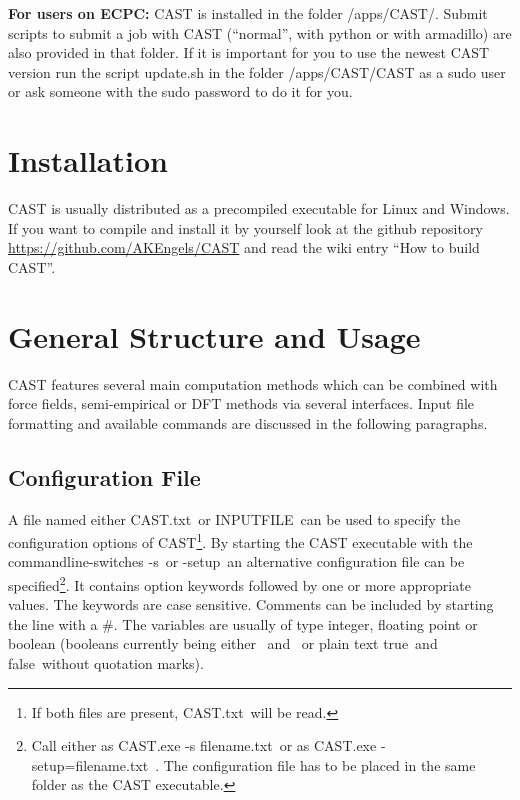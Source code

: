 \documentclass[10pt,a4paper]{article} %
\begin{document}
	\textbf{For users on ECPC:} CAST is installed in the folder /apps/CAST/. Submit scripts to submit a job with CAST (``normal'', with python or with armadillo) are also provided in that folder. If it is important for you to use the newest CAST version run the script update.sh in the folder /apps/CAST/CAST as a sudo user or ask someone with the sudo password to do it for you.

	
	\newpage

	\section{Installation}
	\ac{CAST} is usually distributed as a precompiled executable for Linux and Windows. If you want to compile and install it by yourself look at the github repository \url{https://github.com/AKEngels/CAST} and read the wiki entry ``How to build CAST''.

	\newpage

	\section{General Structure and Usage}
	\ac{CAST} features several main computation methods which can be combined with force fields, semi-empirical or \ac{DFT} methods via several interfaces. Input file formatting and available commands are discussed in the following paragraphs.


	\subsection{Configuration File}
	A file named either \glqq CAST.txt\grqq~or \glqq INPUTFILE\grqq~can be used to specify the configuration options of \ac{CAST}\footnote{If both files are present, \glqq CAST.txt\grqq~will be read.}. By starting the CAST executable with the commandline-switches \glqq -s\grqq~or \glqq -setup\grqq~an alternative configuration file can be specified\footnote{Call either as \glqq CAST.exe -s filename.txt\grqq~or as \glqq CAST.exe -setup=filename.txt\grqq~. The configuration file has to be placed in the same folder as the CAST executable.}. It contains option keywords followed by one or more appropriate values. The keywords are case sensitive. Comments can be included by starting the line with a \glqq \#\grqq. The variables are usually of type integer, floating point or boolean (booleans currently being either \grqq~and \grqq~or plain text \glqq true\grqq~and \glqq false\grqq~without quotation marks).\\
\end{document}
